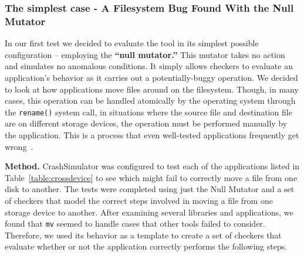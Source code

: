 \subsubsection{The simplest case - A Filesystem Bug Found With the Null Mutator}
\label{sec-move-bugs}
In our first test we decided to evaluate the tool in its simplest possible
configuration -- employing the {\bf ``null mutator.''}
This mutator takes no action and simulates no anomalous conditions.
It simply allows checkers to evaluate an application's behavior
as it carries out a potentially-buggy operation.
We decided to look at how applications
move files around on the filesystem.
Though, in many cases, this operation can be handled
atomically by the operating system
through the {\tt rename()} system call,
in situations where
the source file and destination file are on different storage devices,
the operation must be performed manually by the application.
This is a process
that even well-tested applications
frequently get wrong~\cite{PHPRenameBug,PythonShutilBug,NodejsCopyBug}.

{\bf Method.}
CrashSimulator was configured
to test each of the applications listed in Table~\ref{table:crossdevice}
to see which might fail to correctly move a file from one disk to another.
The tests were completed using just the Null Mutator and a set of
checkers that model the correct steps involved in moving a file from one
storage device to another.
After examining several libraries and applications,
we found that
{\tt mv} seemed to handle cases that other tools failed to consider.
Therefore, we
used its behavior as a template to create a set of checkers
that evaluate whether or not
the application correctly performs the following
steps.

